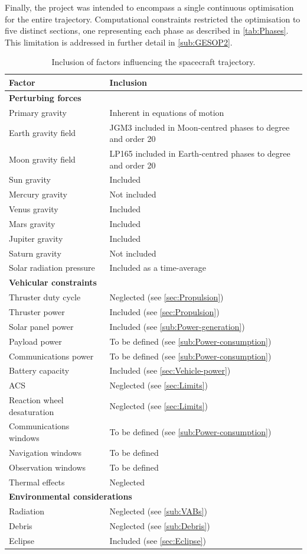 Finally, the project was intended to encompass a single continuous optimisation for the entire trajectory. Computational constraints restricted the optimisation to five distinct sections, one representing each phase as described in \autoref{tab:Phases}. This limitation is addressed in further detail in \autoref{sub:GESOP2}. 

\begin{table}
\centering
\caption{Inclusion of factors influencing the spacecraft trajectory.} \label{tab:Scope-limitations}
\begin{tabular}{p{} p{}} \toprule
Factor & Inclusion \tabularnewline\midrule
\textbf{Perturbing forces} \tabularnewline
Primary gravity & Inherent in equations of motion \tabularnewline
Earth gravity field & JGM3 included in Moon-centred phases to degree and order 20\tabularnewline
Moon gravity field & LP165 included in Earth-centred phases to degree and order 20\tabularnewline
Sun gravity & Included \tabularnewline
Mercury gravity & Not included \tabularnewline
Venus gravity & Included \tabularnewline
Mars gravity & Included \tabularnewline
Jupiter gravity & Included \tabularnewline
Saturn gravity & Not included \tabularnewline
Solar radiation pressure & Included as a time-average \tabularnewline
\textbf{Vehicular constraints} \tabularnewline
Thruster duty cycle & Neglected (see \autoref{sec:Propulsion}) \tabularnewline
Thruster power & Included (see \autoref{sec:Propulsion}) \tabularnewline
Solar panel power & Included (see \autoref{sub:Power-generation}) \tabularnewline
Payload power & To be defined (see \autoref{sub:Power-consumption}) \tabularnewline
Communications power & To be defined (see \autoref{sub:Power-consumption}) \tabularnewline
Battery capacity & Included (see \autoref{sec:Vehicle-power}) \tabularnewline
ACS & Neglected (see \autoref{sec:Limits}) \tabularnewline
Reaction wheel desaturation & Neglected (see \autoref{sec:Limits})\tabularnewline
Communications windows & To be defined (see \autoref{sub:Power-consumption}) \tabularnewline
Navigation windows & To be defined \tabularnewline
Observation windows & To be defined \tabularnewline
Thermal effects & Neglected \tabularnewline\midrule
\multicolumn{2}{l}{\textbf{Environmental considerations}} \tabularnewline
Radiation & Neglected (see \autoref{sub:VABs}) \tabularnewline
Debris & Neglected (see \autoref{sub:Debris}) \tabularnewline
Eclipse & Included (see \autoref{sec:Eclipse}) \tabularnewline
\bottomrule
\end{tabular}
\end{table}

